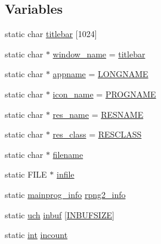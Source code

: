 \subsection*{Variables}
\begin{DoxyCompactItemize}
\item 
static char \mbox{\hyperlink{rpng2-x_8c_a7d71fb2a6cfb5d27855f58bc7e548978}{titlebar}} \mbox{[}1024\mbox{]}
\item 
static char $\ast$ \mbox{\hyperlink{rpng2-x_8c_ad98b89261d368fd018f2d8de359b6863}{window\+\_\+name}} = \mbox{\hyperlink{rpng2-x_8c_a7d71fb2a6cfb5d27855f58bc7e548978}{titlebar}}
\item 
static char $\ast$ \mbox{\hyperlink{rpng2-x_8c_a9db0329b02c3e8e0260939a1c680738a}{appname}} = \mbox{\hyperlink{_visual_png_8c_ae8176192ea4d52bb0acbcfeaaffb3bd8}{L\+O\+N\+G\+N\+A\+ME}}
\item 
static char $\ast$ \mbox{\hyperlink{rpng2-x_8c_a2f4fb0c5d67793c3073266f0d247a33d}{icon\+\_\+name}} = \mbox{\hyperlink{_visual_png_8c_a8c9afb758de9a0355c93fc926b8ce6b1}{P\+R\+O\+G\+N\+A\+ME}}
\item 
static char $\ast$ \mbox{\hyperlink{rpng2-x_8c_ae178e0b707bb083445446bacf79138f0}{res\+\_\+name}} = \mbox{\hyperlink{rpng2-x_8c_a26d3cf6f35fd25b054ff41b03368b31b}{R\+E\+S\+N\+A\+ME}}
\item 
static char $\ast$ \mbox{\hyperlink{rpng2-x_8c_a0aeb2856c5f54c1744e73632e7c595b7}{res\+\_\+class}} = \mbox{\hyperlink{rpng2-x_8c_a3b0a2ac91fca697e3acedd9903efd4fd}{R\+E\+S\+C\+L\+A\+SS}}
\item 
static char $\ast$ \mbox{\hyperlink{rpng2-x_8c_aeac90097f29f7529968697163cea5c18}{filename}}
\item 
static F\+I\+LE $\ast$ \mbox{\hyperlink{rpng2-x_8c_af19157da745ecb3f2b088c8f3a10c0a7}{infile}}
\item 
static \mbox{\hyperlink{readpng2_8h_a1b06d069c8b16f46dd13c65e745bbdcb}{mainprog\+\_\+info}} \mbox{\hyperlink{rpng2-x_8c_a620379ebfcc5817eef3e6a063e83f64f}{rpng2\+\_\+info}}
\item 
static \mbox{\hyperlink{readpng_8h_af3307af5922c72924a837559c801a8a4}{uch}} \mbox{\hyperlink{rpng2-x_8c_a82a0c3437e717af50ffb2c5244a611dd}{inbuf}} \mbox{[}\mbox{\hyperlink{rpng2-x_8c_ab3f00dac33458432279d4308226d8413}{I\+N\+B\+U\+F\+S\+I\+ZE}}\mbox{]}
\item 
static \mbox{\hyperlink{ioapi_8h_a787fa3cf048117ba7123753c1e74fcd6}{int}} \mbox{\hyperlink{rpng2-x_8c_aeb67c5d07a9a094de6dc172d6ef53766}{incount}}
\item 

\end{DoxyCompactItemize}
